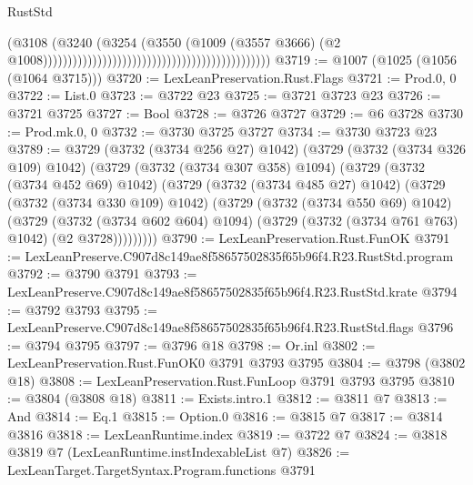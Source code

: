 \begin{lexlean}{RustStd}
\begin{coremodule}
                                                                                    (@3108
                                                                                      (@3240
                                                                                        (@3254
                                                                                          (@3550
                                                                                            (@1009
                                                                                              (@3557
                                                                                                @3666)
                                                                                              (@2
                                                                                                @1008))))))))))))))))))))))))))))))))))))))))))))))
@3719 := @1007 (@1025 (@1056 (@1064 @3715)))
@3720 := LexLeanPreservation.Rust.Flags
@3721 := Prod.{0, 0}
@3722 := List.{0}
@3723 := @3722 @23
@3725 := @3721 @3723 @23
@3726 := @3721 @3725
@3727 := Bool
@3728 := @3726 @3727
@3729 := @6 @3728
@3730 := Prod.mk.{0, 0}
@3732 := @3730 @3725 @3727
@3734 := @3730 @3723 @23
@3789 := @3729
    (@3732 (@3734 @256 @27) @1042)
    (@3729
      (@3732 (@3734 @326 @109) @1042)
      (@3729
        (@3732 (@3734 @307 @358) @1094)
        (@3729
          (@3732 (@3734 @452 @69) @1042)
          (@3729
            (@3732 (@3734 @485 @27) @1042)
            (@3729
              (@3732 (@3734 @330 @109) @1042)
              (@3729
                (@3732 (@3734 @550 @69) @1042)
                (@3729
                  (@3732 (@3734 @602 @604) @1094)
                  (@3729 (@3732 (@3734 @761 @763) @1042) (@2 @3728)))))))))
@3790 := LexLeanPreservation.Rust.FunOK
@3791 := LexLeanPreserve.C907d8c149ae8f58657502835f65b96f4.R23.RustStd.program
@3792 := @3790 @3791
@3793 := LexLeanPreserve.C907d8c149ae8f58657502835f65b96f4.R23.RustStd.krate
@3794 := @3792 @3793
@3795 := LexLeanPreserve.C907d8c149ae8f58657502835f65b96f4.R23.RustStd.flags
@3796 := @3794 @3795
@3797 := @3796 @18
@3798 := Or.inl
@3802 := LexLeanPreservation.Rust.FunOK0 @3791 @3793 @3795
@3804 := @3798 (@3802 @18)
@3808 := LexLeanPreservation.Rust.FunLoop @3791 @3793 @3795
@3810 := @3804 (@3808 @18)
@3811 := Exists.intro.{1}
@3812 := @3811 @7
@3813 := And
@3814 := Eq.{1}
@3815 := Option.{0}
@3816 := @3815 @7
@3817 := @3814 @3816
@3818 := LexLeanRuntime.index
@3819 := @3722 @7
@3824 := @3818 @3819 @7 (LexLeanRuntime.instIndexableList @7)
@3826 := LexLeanTarget.TargetSyntax.Program.functions @3791

\end{coremodule}
\end{lexlean}
